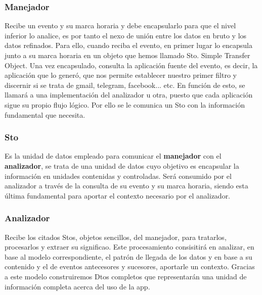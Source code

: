\documentclass[12pt,a4paper,oneside]{book} %
\begin{document}
\subsubsection{Manejador}
Recibe un evento y su marca horaria y debe encapsularlo para que el nivel inferior lo analice, es por tanto el nexo de unión entre los datos en bruto y los datos refinados. 
\newline
\newline
Para ello, cuando reciba el evento, en primer lugar lo encapsula junto a su marca horaria en un objeto que hemos llamado Sto. Simple Transfer Object. 
\newline
\newline
Una vez encapsulado, consulta la aplicación fuente del evento, es decir, la aplicación que lo generó, que nos permite establecer nuestro primer filtro y discernir si se trata de gmail, telegram, facebook... etc. 
\newline
\newline
En función de esto, se llamará a una implementación del analizador u otra, puesto que cada aplicación sigue su propio flujo lógico. Por ello se le comunica un Sto con la información fundamental que necesita. 
\subsubsection{Sto}
Es la unidad de datos empleado para comunicar el \textbf{manejador} con el \textbf{analizador}, se trata de una unidad de datos cuyo objetivo es encapsular la información en unidades contenidas y controladas. Será consumido por el analizador a través de la consulta de su evento y su marca horaria, siendo esta última fundamental para aportar el contexto necesario por el analizador. 
\subsubsection{Analizador}
Recibe los citados Stos, objetos sencillos, del manejador, para tratarlos, procesarlos y extraer su significao. 
\newline
\newline
Este procesamiento consisitirá en analizar, en base al modelo correspondiente, el patrón de llegada de los datos y en base a su contenido y el de eventos antecesores y sucesores, aportarle un contexto. Gracias a este modelo construiremos Dtos completos que representarán una unidad de información completa acerca del uso de la app.
\end{document}
